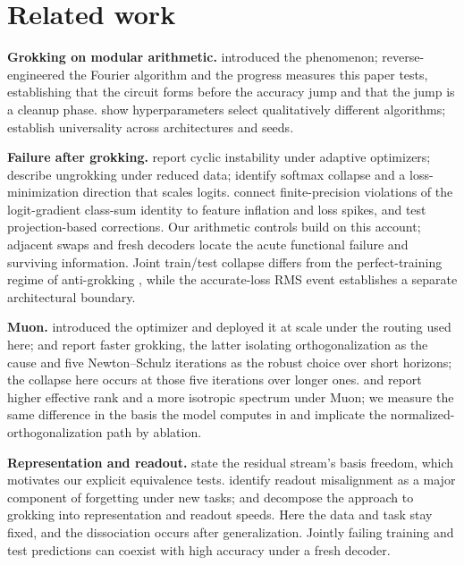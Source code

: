 \documentclass{article}
\begin{document}
\section{Related work}
\label{sec:related}

\textbf{Grokking on modular arithmetic.} \citet{power2022grokking} introduced the phenomenon; \citet{nanda2023progress} reverse-engineered the Fourier algorithm and the progress measures this paper tests, establishing that the circuit forms before the accuracy jump and that the jump is a cleanup phase. \citet{zhong2023clock} show hyperparameters select qualitatively different algorithms; \citet{chughtai2023toy} establish universality across architectures and seeds.

\textbf{Failure after grokking.} \citet{thilak2022slingshot} report cyclic instability under adaptive optimizers; \citet{varma2023explaining} describe ungrokking under reduced data; \citet{prieto2025grokking} identify softmax collapse and a loss-minimization direction that scales logits. \citet{liu2026glitching} connect finite-precision violations of the logit-gradient class-sum identity to feature inflation and loss spikes, and test projection-based corrections. Our arithmetic controls build on this account; adjacent swaps and fresh decoders locate the acute functional failure and surviving information. Joint train/test collapse differs from the perfect-training regime of anti-grokking \citep{prakash2025grokking}, while the accurate-loss RMS event establishes a separate architectural boundary.

\textbf{Muon.} \citet{jordan2024muon} introduced the optimizer and \citet{liu2025muon} deployed it at scale under the routing used here; \citet{tveit2025muon} and \citet{wang2026active} report faster grokking, the latter isolating orthogonalization as the cause and five Newton--Schulz iterations as the robust choice over short horizons; the collapse here occurs at those five iterations over longer ones. \citet{ruan2026muon} and \citet{wang2025tailend} report higher effective rank and a more isotropic spectrum under Muon; we measure the same difference in the basis the model computes in and implicate the normalized-orthogonalization path by ablation.

\textbf{Representation and readout.} \citet{elhage2021framework} state the residual stream's basis freedom, which motivates our explicit equivalence tests. \citet{anthes2023diagnosing} identify readout misalignment as a major component of forgetting under new tasks; \citet{chou2026twospeeds} and \citet{gomezjurado2026longdelay} decompose the approach to grokking into representation and readout speeds. Here the data and task stay fixed, and the dissociation occurs after generalization. Jointly failing training and test predictions can coexist with high accuracy under a fresh decoder.
\end{document}
